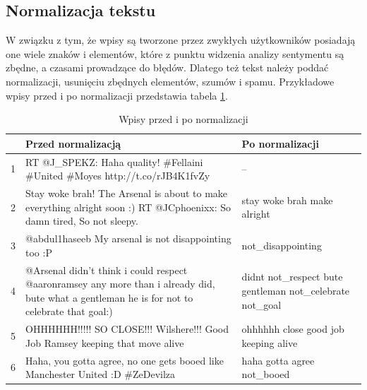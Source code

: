 \subsection{Normalizacja tekstu}
\label{subsection:normalizacjatekstu}

W związku z tym, że wpisy są tworzone przez zwykłych użytkowników posiadają one
wiele znaków i elementów, które z punktu widzenia analizy sentymentu są zbędne,
a czasami prowadzące do błędów. Dlatego też tekst należy poddać normalizacji,
usunięciu zbędnych elementów, szumów i spamu. Przykładowe wpisy przed i po
normalizacji przedstawia tabela \ref{tab:wpisy-normalizacja}.


\begin{table}[ht!]  
\begin{center}  
\begin{tabular}{|r|p{70mm}|p{70mm}|}
\hline
 & Przed normalizacją & Po normalizacji
\\ \hline

1 
& RT @J\_SPEKZ: Haha quality! \#Fellaini \#United \#Moyes http://t.co/rJB4K1fvZy
& --

\\ \hline

2
& Stay woke brah! The Arsenal is about to make everything alright soon :) RT
@JCphoenixx: So damn tired, So not sleepy. 
& stay woke brah make alright

\\ \hline

3 
& @abdul1haseeb My arsenal is not disappointing too :P
& not\_disappointing
 
\\ \hline

4 
& @Arsenal didn't think i could respect @aaronramsey any more than i already
did, bute what a gentleman he is for not to celebrate that goal:) 
& didnt not\_respect bute gentleman not\_celebrate not\_goal

\\ \hline

5 
& OHHHHHH!!!!! SO CLOSE!!! Wilshere!!! Good Job Ramsey keeping that move alive
& ohhhhhh close good job keeping alive

\\ \hline

6 
& Haha, you gotta agree, no one gets booed like Manchester United :D \#ZeDevilza
& haha gotta agree not\_booed

\\ \hline
\end{tabular} 
\end{center} 
\caption{Wpisy przed i po normalizacji}
\label{tab:wpisy-normalizacja}
\end{table}

